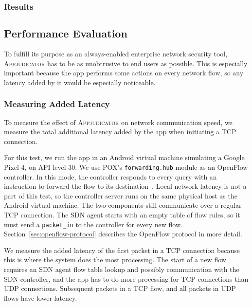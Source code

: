 \subsubsection{Results}
\label{sec:practical-results}


\subsection{Performance Evaluation}
\label{sec:performance-evaluation}

To fulfill its purpose as an always-enabled enterprise network security tool,
\textsc{Appjudicator} has to be as unobtrusive to end users as possible. This is
especially important because the app performs some actions on every network
flow, so any latency added by it would be especially noticeable.

\subsubsection{Measuring Added Latency}
\label{sec:measuring-added-latency}

To measure the effect of \textsc{Appjudicator} on network communication speed,
we measure the total additional latency added by the app when initiating a TCP
connection.

For this test, we run the app in an Android virtual machine simulating a Google
Pixel 4, on API level 30. We use POX's \texttt{forwarding.hub} module as an
OpenFlow controller. In this mode, the controller responds to every query with
an instruction to forward the flow to its destination~\cite{mccauley2015}. Local
network latency is not a part of this test, so the controller server runs on the
same physical host as the Android virtual machine. The two components still
communicate over a regular TCP connection. The SDN agent starts with an empty
table of flow rules, so it must send a \texttt{packet\_in} to the controller for
every new flow. Section~\ref{sec:openflow-protocol} describes the OpenFlow
protocol in more detail.

We measure the added latency of the first packet in a TCP connection because
this is where the system does the most processing. The start of a new flow
requires an SDN agent flow table lookup and possibly communication with the SDN
controller, and the app has to do more processing for TCP connections than UDP
connections. Subsequent packets in a TCP flow, and all packets in UDP flows
have lower latency.

